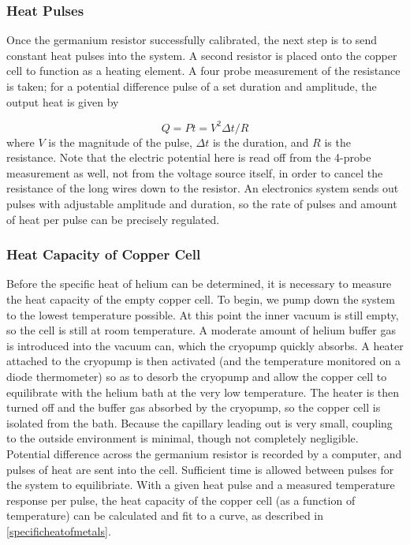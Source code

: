 \subsubsection{Heat Pulses}

Once the germanium resistor successfully calibrated, the next step is
to send constant heat pulses into the system. A second resistor is
placed onto the copper cell to function as a heating element. A four
probe measurement of the resistance is taken; for a potential
difference pulse of a set duration and amplitude, the output heat is given by

\begin{equation}
Q = P t = V^{2} \Delta t /R
\end{equation}
where $V$ is the magnitude of the pulse, $\Delta t$ is the duration,
and $R$ is the resistance. Note that the electric potential here is
read off from the 4-probe measurement as well, not from the voltage
source itself, in order to cancel the resistance of the long wires
down to the resistor. An electronics system sends out pulses with
adjustable amplitude and duration, so the rate of pulses and amount of
heat per pulse can be precisely regulated.


\subsubsection{Heat Capacity of Copper Cell}

Before the specific heat of helium can be determined, it is necessary
to measure the heat capacity of the empty copper cell. To begin, we
pump down the system to the lowest temperature possible. At this point
the inner vacuum is still empty, so the cell is still at room
temperature. A moderate amount of helium buffer gas is introduced into
the vacuum can, which the cryopump quickly absorbs. A heater attached
to the cryopump is then activated (and the temperature monitored on a
diode thermometer) so as to desorb the cryopump and allow the copper
cell to equilibrate with the helium bath at the very low
temperature. The heater is then turned off and the buffer gas absorbed
by the cryopump, so the copper cell is isolated from the bath. Because
the capillary leading out is very small, coupling to the outside
environment is minimal, though not completely negligible. Potential
difference across the germanium resistor is recorded by a computer,
and pulses of heat are sent into the cell. Sufficient time is allowed
between pulses for the system to equilibriate. With a given heat pulse
and a measured temperature response per pulse, the heat capacity of
the copper cell (as a function of temperature) can be calculated and
fit to a curve, as described in \ref{specificheatofmetals}.


